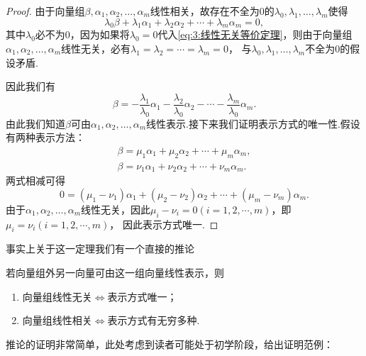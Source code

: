 \begin{enumerate}
          \begin{proof}
            由于向量组$\beta,\alpha_1,\alpha_2,\ldots,\alpha_m$线性相关，故存在不全为0的$\lambda_0,\lambda_1,\ldots,\lambda_m$使得
            \begin{equation}\label{eq:3:线性无关等价定理}
                \lambda_0\beta+\lambda_1\alpha_1+\lambda_2\alpha_2+\cdots+\lambda_m\alpha_m=0,
            \end{equation}
            其中$\lambda_0$必不为0，因为如果将$\lambda_0=0$代入\autoref{eq:3:线性无关等价定理}，则由于向量组
            $\alpha_1,\alpha_2,\ldots,\alpha_m$线性无关，必有$\lambda_1=\lambda_2=\cdots=\lambda_m=0$，
            与$\lambda_0,\lambda_1,\ldots,\lambda_m$不全为0的假设矛盾.

            因此我们有
            \[\beta=-\frac{\lambda_1}{\lambda_0}\alpha_1-\frac{\lambda_2}{\lambda_0}\alpha_2-\cdots-\frac{\lambda_m}{\lambda_0}\alpha_m.\]
            由此我们知道$\beta$可由$\alpha_1,\alpha_2,\ldots,\alpha_m$线性表示.接下来我们证明表示方式的唯一性.假设有两种表示方法：
            \begin{gather*}
                \beta=\mu_1\alpha_1+\mu_2\alpha_2+\cdots+\mu_m\alpha_m, \\
                \beta=\nu_1\alpha_1+\nu_2\alpha_2+\cdots+\nu_m\alpha_m.
            \end{gather*}
            两式相减可得
            \[0=(\mu_1-\nu_1)\alpha_1+(\mu_2-\nu_2)\alpha_2+\cdots+(\mu_m-\nu_m)\alpha_m.\]
            由于$\alpha_1,\alpha_2,\ldots,\alpha_m$线性无关，因此$\mu_i-\nu_i=0(i=1,2,\cdots,m)$，即$\mu_i=\nu_i(i=1,2,\cdots,m)$，
            因此表示方式唯一.
          \end{proof}

          事实上关于这一定理我们有一个直接的推论
          \begin{corollary}
            若向量组外另一向量可由这一组向量线性表示，则
            \begin{enumerate}
                \item 向量组线性无关$\iff$表示方式唯一；

                \item 向量组线性相关$\iff$表示方式有无穷多种.
            \end{enumerate}
          \end{corollary}
          推论的证明非常简单，此处考虑到读者可能处于初学阶段，给出证明范例：
          

\end{enumerate}
